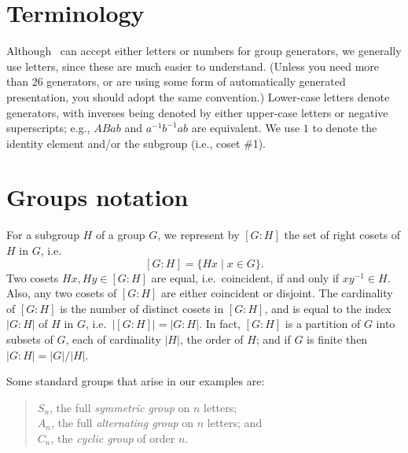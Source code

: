 


\section{Terminology}

Although \ace\ can accept either letters or numbers for group generators,
  we generally use letters, since these are much easier to understand.
(Unless you need more than $26$ generators, or are using some form of 
  automatically generated presentation, you should adopt the same
  convention.)
Lower-case letters denote generators, with inverses being denoted by either
  upper-case letters or negative superscripts; e.g., $ABab$ and
  $a^{-1}b^{-1}ab$ are equivalent.
We use $1$ to denote the identity element and/or the subgroup (i.e.,
  coset \#1).


\section{Groups notation}
For a subgroup $H$ of a group $G$, we represent by $[G:H]$ the set of right
  cosets of $H$ in $G$, i.e.
  $$ [G:H] = \{ Hx \mid x \in G \}. $$
Two cosets $Hx, Hy \in [G:H]$ are equal, i.e.~coincident, if and only if
  $xy^{-1} \in H$.
Also, any two cosets of $[G:H]$ are either coincident or disjoint.
The cardinality of $[G:H]$ is the number of distinct cosets in $[G:H]$,
  and is equal to the index $|G:H|$ of $H$ in $G$, 
  i.e.~$\bigl|[G:H]\bigr| = |G:H|$.
In fact, $[G:H]$ is a partition of $G$ into subsets of $G$, each of
  cardinality $|H|$, the order of $H$; and if $G$ is finite then
  $|G:H| = |G|/|H|$.

Some standard groups that arise in our examples are:
  \begin{quote}
    $S_n$, the full \emph{symmetric group} on $n$ letters;\\
    $A_n$, the full \emph{alternating group} on $n$ letters; and\\
    $C_n$, the \emph{cyclic group} of order $n$.
  \end{quote}

